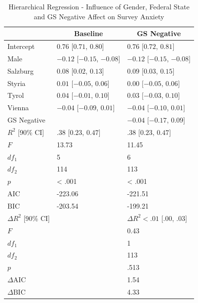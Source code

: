 \documentclass[
  english,
  jou,floatsintext]{apa7}
\begin{document}
\begin{table}[b]

\begin{center}
\begin{threeparttable}

\caption{\label{tab:table-anx-GS}Hierarchical Regression - Influence of Gender, Federal State and GS Negative Affect on Survey Anxiety}

\small{

\begin{tabular}{lll}
\toprule
 & \multicolumn{1}{c}{Baseline} & \multicolumn{1}{c}{GS Negative}\\
\midrule
Intercept & $0.76$ $[0.71$, $0.80]$ & $0.76$ $[0.72$, $0.81]$\\
Male & $-0.12$ $[-0.15$, $-0.08]$ & $-0.12$ $[-0.15$, $-0.08]$\\
Salzburg & $0.08$ $[0.02$, $0.13]$ & $0.09$ $[0.03$, $0.15]$\\
Styria & $0.01$ $[-0.05$, $0.06]$ & $0.00$ $[-0.05$, $0.06]$\\
Tyrol & $0.04$ $[-0.01$, $0.10]$ & $0.03$ $[-0.03$, $0.10]$\\
Vienna & $-0.04$ $[-0.09$, $0.01]$ & $-0.04$ $[-0.10$, $0.01]$\\
GS Negative &  & $-0.04$ $[-0.17$, $0.09]$\\
$R^2$ [90\% CI] & $.38$ $[0.23$, $0.47]$ & $.38$ $[0.23$, $0.47]$\\
$F$ & 13.73 & 11.45\\
$df_1$ & 5 & 6\\
$df_2$ & 114 & 113\\
$p$ & < .001 & < .001\\
$\mathrm{AIC}$ & -223.06 & -221.51\\
$\mathrm{BIC}$ & -203.54 & -199.21\\
$\Delta R^2$ [90\% CI] &  & $\Delta R^2 < .01$ $[.00$, $.03]$\\
$F$ &  & 0.43\\
$df_1$ &  & 1\\
$df_2$ &  & 113\\
$p$ &  & .513\\
$\Delta \mathrm{AIC}$ &  & 1.54\\
$\Delta \mathrm{BIC}$ &  & 4.33\\
\bottomrule
\end{tabular}

}

\end{threeparttable}
\end{center}

\end{table}
\end{document}
